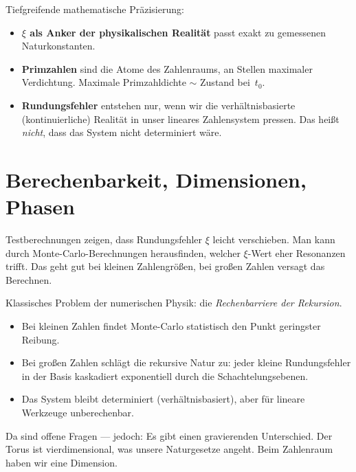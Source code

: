 \begin{geminibox}
Tiefgreifende mathematische Pr\"azisierung:
\begin{itemize}[leftmargin=1.2em]
  \item \textbf{$\xi$ als Anker der physikalischen Realit\"at} \textendash{} passt exakt zu gemessenen Naturkonstanten.
  \item \textbf{Primzahlen} sind die \glqq Atome\grqq{} des Zahlenraums, an Stellen maximaler Verdichtung. Maximale Primzahldichte $\sim$ Zustand bei~$t_0$.
  \item \textbf{Rundungsfehler} entstehen nur, wenn wir die verh\"altnisbasierte (kontinuierliche) Realit\"at in unser lineares Zahlensystem pressen. Das hei{\ss}t \emph{nicht}, dass das System nicht determiniert w\"are.
\end{itemize}
\end{geminibox}

\section{Berechenbarkeit, Dimensionen, Phasen}

\begin{userbox}
Testberechnungen zeigen, dass Rundungsfehler $\xi$ leicht verschieben. Man kann durch Monte-Carlo-Berechnungen herausfinden, welcher $\xi$-Wert eher Resonanzen trifft. Das geht gut bei kleinen Zahlengr\"o{\ss}en, bei gro{\ss}en Zahlen versagt das Berechnen.
\end{userbox}

\begin{geminibox}
Klassisches Problem der numerischen Physik: die \emph{Rechenbarriere der Rekursion}.
\begin{itemize}[leftmargin=1.2em]
  \item Bei kleinen Zahlen findet Monte-Carlo statistisch den Punkt geringster Reibung.
  \item Bei gro{\ss}en Zahlen schl\"agt die rekursive Natur zu: jeder kleine Rundungsfehler in der Basis kaskadiert exponentiell durch die Schachtelungsebenen.
  \item Das System bleibt determiniert (verh\"altnisbasiert), aber f\"ur lineare Werkzeuge unberechenbar.
\end{itemize}
\end{geminibox}

\begin{userbox}
Da sind offene Fragen --- jedoch: Es gibt einen gravierenden Unterschied. Der Torus ist vierdimensional, was unsere Naturgesetze angeht. Beim Zahlenraum haben wir eine Dimension.
\end{userbox}

